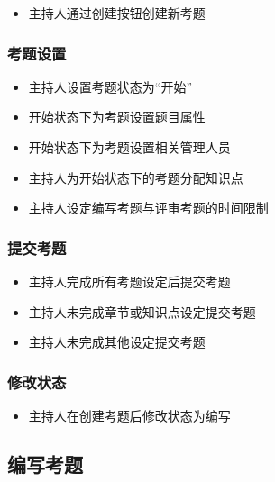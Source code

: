 \documentclass[hyperref, a4paper]{ctexart}
\providecommand{\tightlist}{%
  \setlength{\itemsep}{0pt}\setlength{\parskip}{0pt}}
\begin{document}
\begin{itemize}
\tightlist
\item
  主持人通过创建按钮创建新考题
\end{itemize}

\hypertarget{ux8003ux9898ux8bbeux7f6e}{%
\subsubsection{考题设置}\label{ux8003ux9898ux8bbeux7f6e}}

\begin{itemize}
\tightlist
\item
  主持人设置考题状态为``开始''
\item
  开始状态下为考题设置题目属性
\item
  开始状态下为考题设置相关管理人员
\item
  主持人为开始状态下的考题分配知识点
\item
  主持人设定编写考题与评审考题的时间限制
\end{itemize}

\hypertarget{ux63d0ux4ea4ux8003ux9898}{%
\subsubsection{提交考题}\label{ux63d0ux4ea4ux8003ux9898}}

\begin{itemize}
\tightlist
\item
  主持人完成所有考题设定后提交考题
\item
  主持人未完成章节或知识点设定提交考题
\item
  主持人未完成其他设定提交考题
\end{itemize}

\hypertarget{ux4feeux6539ux72b6ux6001}{%
\subsubsection{修改状态}\label{ux4feeux6539ux72b6ux6001}}

\begin{itemize}
\tightlist
\item
  主持人在创建考题后修改状态为编写
\end{itemize}

\hypertarget{ux7f16ux5199ux8003ux9898}{%
\subsection{编写考题}\label{ux7f16ux5199ux8003ux9898}}
\end{document}
